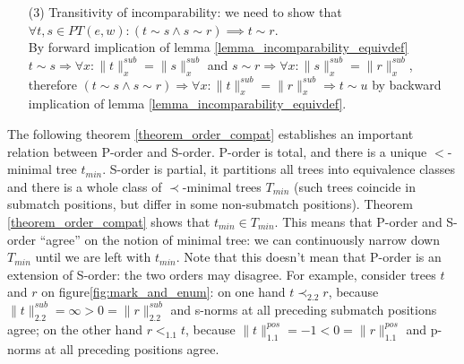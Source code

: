 \documentclass[AMA,STIX1COL]{WileyNJD-v2}
\newcommand{\PT}{PT}
\newcommand{\pnorm}[2]{\|{#1}\|^{pos}_{#2}}
\newcommand{\snorm}[2]{\|{#1}\|^{sub}_{#2}}
\begin{document}
\begin{proofEnd}
\begin{itemize}[itemsep=0.2em, topsep=0.5em]
        \item[(3)]
            Transitivity of incomparability: we need to show that $\forall t, s \in \PT(e, w): (t \sim s \wedge s \sim r) \implies t \sim r$.
            \\[0.5em]
            By forward implication of lemma \ref{lemma_incomparability_equivdef}
            $t \sim s \Rightarrow \forall x : \snorm{t}{x} = \snorm{s}{x}$ and
            $s \sim r \Rightarrow \forall x : \snorm{s}{x} = \snorm{r}{x}$, therefore
            $(t \sim s \wedge s \sim r) \Rightarrow \forall x : \snorm{t}{x} = \snorm{r}{x} \Rightarrow t \sim u$
            by backward implication of lemma \ref{lemma_incomparability_equivdef}.
    \end{itemize}
\end{proofEnd}

The following theorem \ref{theorem_order_compat} establishes an important relation between P-order and S-order.
P-order is total, and there is a unique $<$-minimal tree $t_{min}$.
S-order is partial, it partitions all trees into equivalence classes
and there is a whole class of $\prec$-minimal trees $T_{min}$
(such trees coincide in submatch positions, but differ in some non-submatch positions).
Theorem \ref{theorem_order_compat} shows that $t_{min} \in T_{min}$.
This means that P-order and S-order ``agree'' on the notion of minimal tree:
we can continuously narrow down $T_{min}$ until we are left with $t_{min}$.
%
Note that this doesn't mean that P-order is an extension of S-order:
the two orders may disagree.
For example, consider trees $t$ and $r$ on figure\ref{fig:mark_and_enum}:
on one hand $t \prec_{2.2} r$, because $\snorm{t}{2.2} = \infty > 0 = \snorm{r}{2.2}$ and s-norms at all preceding submatch positions agree;
on the other hand $r <_{1.1} t$, because $\pnorm{t}{1.1} = -1 < 0 = \pnorm{r}{1.1}$
and p-norms at all preceding positions agree.
\end{document}
